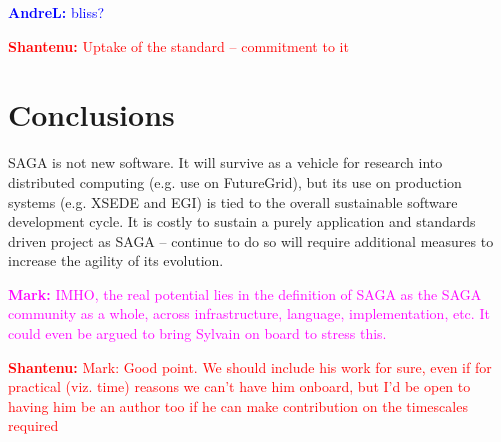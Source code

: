 \documentclass[]{article}
\newcommand{\B}[1]{\textbf{#1}}
\newcommand{\jhanote}[1]{{\textcolor{red}{     \B{Shantenu:} #1 }}}
\newcommand{\alnote}[1]{{\textcolor{blue}{    \B{AndreL:  } #1 }}}
\newcommand{\msnote}[1]{{\textcolor{magenta}{ \B{Mark:    } #1 }}}
\newcommand{\hknote}[1]{{\textcolor{red}{  \B{Hartmut: } #1 }}}
\newcommand{\jhanote}[1]{}
\newcommand{\alnote}[1]{}
\newcommand{\msnote}[1]{}
\newcommand{\hknote}[1]{}
\begin{document}

  \alnote{bliss?}


  \jhanote{Uptake of the standard -- commitment to it}



\section{Conclusions}
\label{sec:conclusions}

SAGA is not new software. It will survive as a vehicle for research
into distributed computing (e.g. use on FutureGrid), but
its use on production systems (e.g. XSEDE and EGI) is tied to the 
overall sustainable software development cycle.  It is costly to
sustain a purely application and standards driven project as SAGA --
continue to do so will require additional measures to increase
the agility of its evolution.

 \msnote{IMHO, the real potential lies in the definition of SAGA as the SAGA
 community as a whole, across infrastructure, language, implementation, etc.  It
 could even be argued to bring Sylvain on board to stress this.}

 \jhanote{Mark: Good point. We should include his work for sure, even if for
 practical (viz. time) reasons we can't have him onboard, but I'd be open to
 having him be an author too if he can make contribution on the timescales
 required}
\end{document}
